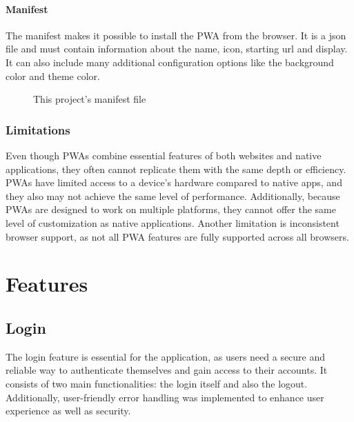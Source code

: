 \documentclass[a4paper,12pt]{report}
\begin{document}
\subsubsection{Manifest}
The manifest makes it possible to install the PWA from the browser. It is a json file and must contain information about the name, icon, starting url and display. It can also include many additional configuration options like the background color and theme color. \parencite{mdn-pwa-installation}
\begin{figure}[H]
	\caption{This project's manifest file}
	\label{fig:example-maifest}
\end{figure}
\subsection{Limitations}
Even though PWAs combine essential features of both websites and native applications, they often cannot replicate them with the same depth or efficiency. \\
PWAs have limited access to a device's hardware compared to native apps, and they also may not achieve the same level of performance. Additionally, because PWAs are designed to work on multiple platforms, they cannot offer the same level of customization as native applications. Another limitation is inconsistent browser support, as not all PWA features are fully supported across all browsers. \parencite{dailydev-pwa-comparison}

\chapter{Features}
\section{Login}
The login feature is essential for the application, as users need a secure and reliable way to authenticate themselves and gain access to their accounts. It consists of two main functionalities: the login itself and also the logout. Additionally, user-friendly error handling was implemented to enhance user experience as well as security. \\
\end{document}

